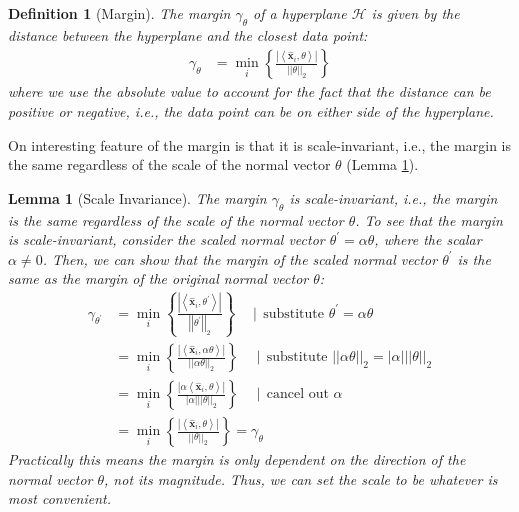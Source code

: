 \documentclass{article}[11pt]
\newtheorem{lemma}{Lemma}
\newtheorem{defn}{Definition}
\newcommand{\norm}[1]{\left|\left|#1\right|\right|}
\begin{document}
\begin{defn}[Margin]\label{defn:margin}
    The margin $\gamma_{\theta}$ of a hyperplane $\mathcal{H}$ is given by the distance between the hyperplane and the closest data point:
    \begin{align*}
        \gamma_{\theta} & = \min_{i}\left\{\frac{|\left<\hat{\mathbf{x}}_{i},\theta\right>|}{\norm{\theta}_{2}}\right\}
    \end{align*}
where we use the absolute value to account for the fact that the distance can be positive or negative, i.e., the data point can be on either side of the hyperplane.
\end{defn}

On interesting feature of the margin is that it is scale-invariant, i.e., the margin is the same regardless of the scale of the normal vector $\theta$
(Lemma \ref{lem:scale-invariance}).
\begin{lemma}[Scale Invariance]\label{lem:scale-invariance}
    The margin $\gamma_{\theta}$ is scale-invariant, i.e., the margin is the same regardless of the scale of the normal vector $\theta$.
    To see that the margin is scale-invariant, consider the scaled normal vector $\theta^{\prime} = \alpha\theta$, where the scalar $\alpha\neq{0}$.
    Then, we can show that the margin of the scaled normal vector $\theta^{\prime}$ is the same as the margin of the original normal vector $\theta$:
    \begin{align*}
        \gamma_{\theta^{\prime}} & = \min_{i}\left\{\frac{|\left<\hat{\mathbf{x}}_{i},\theta^{\prime}\right>|}{\norm{\theta^{\prime}}_{2}}\right\}\quad\mid\,\text{substitute $\theta^{\prime} = \alpha\theta$} \\
        & = \min_{i}\left\{\frac{|\left<\hat{\mathbf{x}}_{i},\alpha\theta\right>|}{\norm{\alpha\theta}_{2}}\right\}\quad\mid\,\text{substitute $\norm{\alpha\theta}_{2} = |\alpha|\norm{\theta}_{2}$} \\
        & = \min_{i}\left\{\frac{|\alpha\left<\hat{\mathbf{x}}_{i},\theta\right>|}{|\alpha|\norm{\theta}_{2}}\right\}\quad\mid\,\text{cancel out $\alpha$} \\
        & = \min_{i}\left\{\frac{|\left<\hat{\mathbf{x}}_{i},\theta\right>|}{\norm{\theta}_{2}}\right\} = \gamma_{\theta}
    \end{align*}
    Practically this means the margin is only dependent on the direction of the normal vector $\theta$, not its magnitude.
    Thus, we can set the scale to be whatever is most convenient.
\end{lemma}
\end{document}
